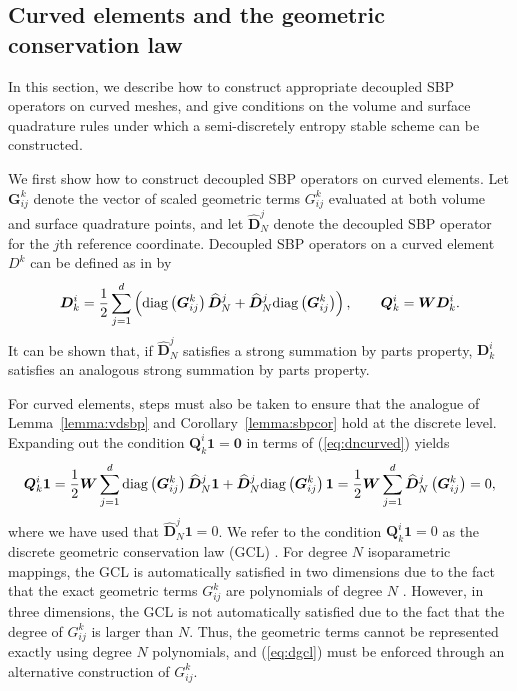 \documentclass[review]{siamart0216}
\theoremstyle{assumption}
\renewcommand{\hat}[1]{\hat{#1}}
\newcommand{\LRp}[1]{\left( #1 \right)}
\renewcommand{\hat}{\widehat}
\newcommand{\diag}[1]{{\rm diag}\LRp{#1}}
\begin{document}
\subsection{Curved elements and the geometric conservation law}
\label{sec:curved}

In this section, we describe how to construct appropriate decoupled SBP operators on curved meshes, and give conditions on the volume and surface quadrature rules under which a semi-discretely entropy stable scheme can be constructed.


We first show how to construct decoupled SBP operators on curved elements.  Let $\bm{G}^k_{ij}$ denote the vector of scaled geometric terms ${G}^k_{ij}$ evaluated at both volume and surface quadrature points, and let $\hat{\bm{D}}^j_N$ denote the decoupled SBP operator for the $j$th reference coordinate.  Decoupled SBP operators on a curved element $D^k$ can be defined as in \cite{chan2018discretely} by
\begin{equation}
\bm{D}^i_k = \frac{1}{2}\sum_{j=1}^d \LRp{\diag{\bm{G}^k_{ij}}\hat{\bm{D}}^j_N + \hat{\bm{D}}^j_N\diag{\bm{G}^k_{ij}}}, \qquad \bm{Q}^i_k = \bm{W} \bm{D}^i_k.
\label{eq:dncurved}
\end{equation}
It can be shown that, if $\hat{\bm{D}}^j_N$ satisfies a strong summation by parts property, $\bm{D}^i_k$ satisfies an analogous strong summation by parts property.

For curved elements, steps must also be taken to ensure that the analogue of Lemma~\ref{lemma:vdsbp} and Corollary~\ref{lemma:sbpcor} hold at the discrete level.  Expanding out the condition $\bm{Q}^i_k\bm{1} = \bm{0}$ in terms of (\ref{eq:dncurved}) yields
\begin{align}
\bm{Q}^i_k \bm{1} = \frac{1}{2} \bm{W}\sum_{j=1}^d \diag{\bm{G}^k_{ij}}\hat{\bm{D}}^j_N \bm{1} + \hat{\bm{D}}^j_N\diag{\bm{G}^k_{ij}}\bm{1} = \frac{1}{2}\bm{W}\sum_{j=1}^d \hat{\bm{D}}^j_N\LRp{\bm{G}^k_{ij}} = 0,
\label{eq:dgcl}
\end{align}
where we have used that $\hat{\bm{D}}^j_N \bm{1} = 0$.  We refer to the condition $\bm{Q}^i_k\bm{1} = 0$ as the discrete geometric conservation law (GCL) \cite{thomas1979geometric, kopriva2006metric}.  For degree $N$ isoparametric mappings, the GCL is automatically satisfied in two dimensions due to the fact that the exact geometric terms ${G}^k_{ij}$ are polynomials of degree $N$ \cite{kopriva2006metric}.  However, in three dimensions, the GCL is not automatically satisfied due to the fact that the degree of $G^k_{ij}$ is larger than $N$.  Thus, the geometric terms cannot be represented exactly using degree $N$ polynomials, and (\ref{eq:dgcl}) must be enforced through an alternative construction of ${G}^k_{ij}$.  
\end{document}

